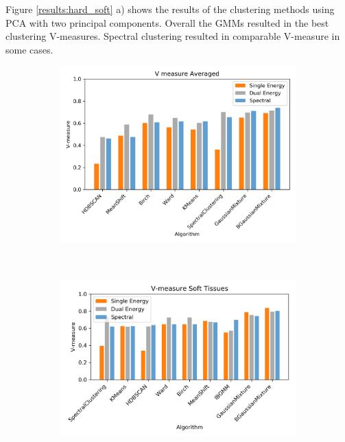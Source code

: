 \documentclass[a4paper,11pt]{article}
\begin{document}
Figure \ref{results:hard_soft} a) shows the results of the clustering methods using PCA with two principal components. Overall the GMMs resulted in the best clustering V-measures. Spectral clustering resulted in comparable V-measure in some cases.

\begin{figure}[b!]
    \centering
    \begin{subfigure}[b]{0.32\textwidth}
        \includegraphics[width=\textwidth]{figures/all_comparison.png}
    \end{subfigure}
    ~ %
    \begin{subfigure}[b]{0.32\textwidth}
        \includegraphics[width=\textwidth]{figures/hard.png}

\end{subfigure}
\end{figure}
\end{document}
